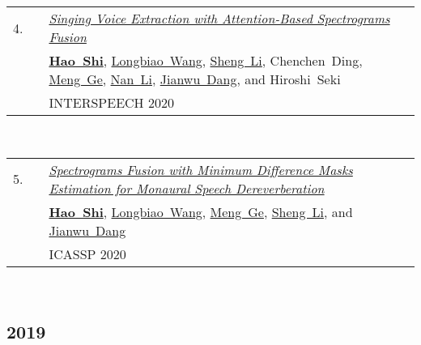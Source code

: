 \documentclass[11pt,letter,sans]{moderncv}
\begin{document}
\begin{minipage}{\textwidth}
\begin{tabular}{R{8mm}p{1mm}L{6.5in}}
 4.\hspace*{1mm} && \textit{\href{https://hshi-speech.github.io/resume/pdf/Wed-1-11-1.pdf}{Singing Voice Extraction with Attention-Based Spectrograms Fusion} }  \\
 && \mbox{\textbf{\href{https://scholar.google.com/citations?user=DclFbLwAAAAJ}{Hao Shi}}}, \mbox{\href{https://scholar.google.com/citations?user=1Z9_5ZgAAAAJ}{Longbiao Wang}}, \mbox{\href{https://scholar.google.com/citations?user=zHAhs0IAAAAJ}{Sheng Li}}, \mbox{Chenchen Ding}, \mbox{\href{https://scholar.google.com/citations?user=Ody4GF0AAAAJ}{Meng Ge}}, \mbox{\href{https://scholar.google.com/citations?user=9BVJbdsAAAAJ}{Nan Li}}, \mbox{\href{https://scholar.google.com/citations?user=Wk5ApskAAAAJ}{Jianwu Dang}}, and \mbox{Hiroshi Seki} \\
 && INTERSPEECH 2020  \\
\end{tabular} \\[2mm]
\end{minipage}

\begin{minipage}{\textwidth}
\begin{tabular}{R{8mm}p{1mm}L{6.5in}}
 5.\hspace*{1mm} && \textit{\href{https://hshi-speech.github.io/resume/pdf/0007539.pdf}{Spectrograms Fusion with Minimum Difference Masks Estimation for Monaural Speech Dereverberation} }  \\
 && \mbox{\textbf{\href{https://scholar.google.com/citations?user=DclFbLwAAAAJ}{Hao Shi}}}, \mbox{\href{https://scholar.google.com/citations?user=1Z9_5ZgAAAAJ}{Longbiao Wang}}, \mbox{\href{https://scholar.google.com/citations?user=Ody4GF0AAAAJ}{Meng Ge}}, \mbox{\href{https://scholar.google.com/citations?user=zHAhs0IAAAAJ}{Sheng Li}}, and \mbox{\href{https://scholar.google.com/citations?user=Wk5ApskAAAAJ}{Jianwu Dang}} \\
 && ICASSP 2020  \\
\end{tabular} \\[2mm]
\end{minipage}
\subsection{2019}
\end{document}
